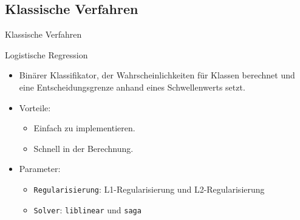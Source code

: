 \documentclass[aspectratio=169]{beamer} %
\begin{document}
\subsection{Klassische Verfahren}

\begin{frame}{Klassische Verfahren}
    \begin{block}{Logistische Regression}
        \begin{itemize}
            \item Binärer Klassifikator, der Wahrscheinlichkeiten für Klassen berechnet und eine Entscheidungsgrenze anhand eines Schwellenwerts setzt.
            \item Vorteile:
                \begin{itemize}
                    \item Einfach zu implementieren.
                    \item Schnell in der Berechnung.
                \end{itemize}
            \item Parameter:
                \begin{itemize}
                    \item \texttt{Regularisierung}: L1-Regularisierung und L2-Regularisierung
                    \item \texttt{Solver}: \texttt{liblinear} und \texttt{saga}
                \end{itemize}
        \end{itemize}
    \end{block} 
\end{frame}
\end{document}
